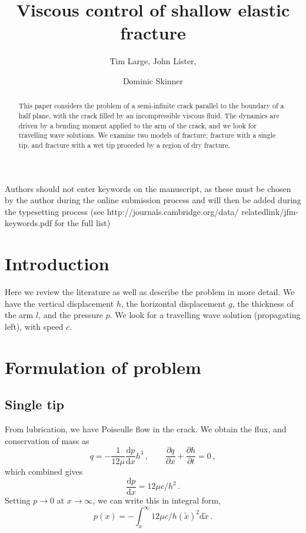 \documentclass{jfm}
\title{Viscous control of shallow elastic fracture}
\author{Tim Large\aff{1},
  John Lister\aff{2},
 \and Dominic Skinner\aff{2}}
\affiliation{\aff{1} M.I.T., USA
\aff{2}Department of Applied Mathematics and Theoretical Physics, University of
Cambridge, UK}
\newcommand{\mrd}{\mathrm{d}}
\begin{document}
\maketitle

\begin{abstract}
This paper considers the problem of a semi-infinite crack parallel to the
boundary of a half plane, with the crack filled by an incompressible viscous
fluid. 
The dynamics are driven by a bending moment applied to the arm of the crack,
and we look for travelling wave solutions. We examine two models of fracture;
fracture with a single tip, and fracture with a wet tip proceded by a region
of dry fracture.
\end{abstract}

\begin{keywords}
Authors should not enter keywords on the manuscript, as these must be chosen by the 
author during the online submission process and will then be added during the 
typesetting process (see http://journals.cambridge.org/data/
\linebreak[3]relatedlink/jfm-\linebreak[3]keywords.pdf for the full list)
\end{keywords}

\section{Introduction}\label{sec:introduction}
Here we review the literature as well as describe the problem in more detail.
We have the vertical displacement $h$, the horizontal displacement $g$, the
thickness of the arm $l$, and the pressure $p$.
We look for a travelling wave solution (propagating left), with speed $c$.
%
% 
\section{Formulation of problem}\label{sec:formulation_of_problem}
%
%
\subsection{Single tip}
From lubrication, we have Poiseulle flow in the crack. We obtain
the flux, and conservation of mass as 
\begin{equation}
q = - \frac{1}{12\mu}\frac{\mrd p}{\mrd x}h^3 \, , \qquad
\frac{\partial q}{\partial x} + \frac{\partial h}{\partial t} = 0 \, ,
\end{equation}
which combined gives
\begin{equation}
\frac{\mrd p}{\mrd x} = 12\mu c / h^2 \, .
\end{equation}
Setting $p\to 0$ at $x \to \infty$, we can write this in integral form,
\begin{equation}
p(x) = -\int_x^{\infty} 12\mu c / h(\tilde{x})^2 \mrd \tilde{x} \, .
\end{equation}
\end{document}
